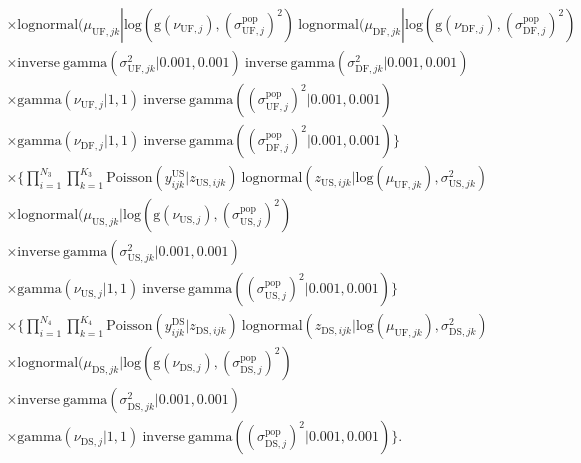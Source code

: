 \documentclass[12pt, oneside, titlepage]{article}   	%
\begin{document}
\begin{align}
\begin{split}
	     & \times \mathrm{lognormal} ( \mu_{\mathrm{UF},jk} | \mathrm{log}(\mathrm{g}(\nu_{\mathrm{UF},j}), (\sigma^\mathrm{pop}_{\mathrm{UF},j} )^2 )\  \mathrm{lognormal} ( \mu_{\mathrm{DF},jk} | \mathrm{log}(\mathrm{g}(\nu_{\mathrm{DF},j}), (\sigma^\mathrm{pop}_{\mathrm{DF},j} )^2 )   \\
	     & \times \mathrm{inverse\ gamma} ( \sigma^2_{\mathrm{UF},jk}  | 0.001, 0.001 )\ \mathrm{inverse\ gamma} ( \sigma^2_{\mathrm{DF},jk}  | 0.001, 0.001 ) \\
	     & \times \mathrm{gamma} (\nu_{\mathrm{UF},j} | 1 , 1)\  \mathrm{inverse\ gamma} ( (\sigma^\mathrm{pop}_{\mathrm{UF},j} )^2  | 0.001, 0.001 ) \\
	     & \times  \mathrm{gamma} (\nu_{\mathrm{DF},j} | 1 , 1)\  \mathrm{inverse\ gamma} ( (\sigma^\mathrm{pop}_{\mathrm{DF},j} )^2  | 0.001, 0.001 ) \Big\}  \\
	      & \times \Big\{  \prod_{i=1}^{N_3}  \prod_{k=1}^{K_3}  \mathrm{Poisson} ( y^\mathrm{US}_{ijk} | z_{\mathrm{US},ijk} )\ \mathrm{lognormal} ( z_{\mathrm{US},ijk} | \mathrm{log}(\mu_{\mathrm{UF},jk}), \sigma^2_{\mathrm{US},jk} )  \\
	     & \times \mathrm{lognormal} ( \mu_{\mathrm{US},jk} | \mathrm{log}(\mathrm{g}(\nu_{\mathrm{US},j}), (\sigma^\mathrm{pop}_{\mathrm{US},j} )^2 )  \\
	     & \times \mathrm{inverse\ gamma} ( \sigma^2_{\mathrm{US},jk}  | 0.001, 0.001 ) \\
	     & \times \mathrm{gamma} (\nu_{\mathrm{US},j} | 1 , 1)\  \mathrm{inverse\ gamma} ( (\sigma^\mathrm{pop}_{\mathrm{US},j} )^2  | 0.001, 0.001 ) \Big\}   \\
	     & \times \Big\{  \prod_{i=1}^{N_4}  \prod_{k=1}^{K_4}  \mathrm{Poisson} ( y^\mathrm{DS}_{ijk} | z_{\mathrm{DS},ijk} )\ \mathrm{lognormal} ( z_{\mathrm{DS},ijk} | \mathrm{log}(\mu_{\mathrm{UF},jk}), \sigma^2_{\mathrm{DS},jk} )  \\
	     & \times \mathrm{lognormal} ( \mu_{\mathrm{DS},jk} | \mathrm{log}(\mathrm{g}(\nu_{\mathrm{DS},j}), (\sigma^\mathrm{pop}_{\mathrm{DS},j} )^2 )  \\
	     & \times \mathrm{inverse\ gamma} ( \sigma^2_{\mathrm{DS},jk}  | 0.001, 0.001 ) \\
	     & \times \mathrm{gamma} (\nu_{\mathrm{DS},j} | 1 , 1)\  \mathrm{inverse\ gamma} ( (\sigma^\mathrm{pop}_{\mathrm{DS},j} )^2 | 0.001, 0.001 ) \Big\}.
  \end{split}
\end{align}
\end{document}
